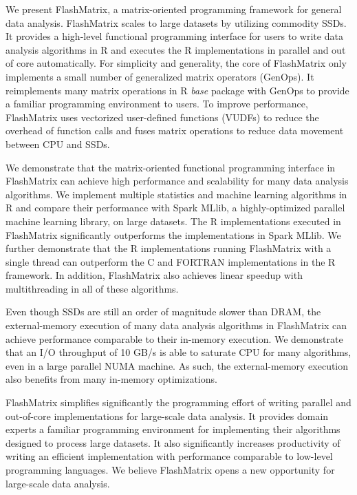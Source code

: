 We present FlashMatrix, a matrix-oriented programming framework for general
data analysis. FlashMatrix scales to large datasets by utilizing commodity SSDs.
It provides a high-level functional programming interface for users to write
data analysis algorithms in R and
executes the R implementations in parallel and out of core automatically.
For simplicity and generality, the core of FlashMatrix only implements
a small number of generalized matrix operators (GenOps). It reimplements
many matrix operations in R \textit{base} package with GenOps to provide
a familiar programming environment to users. To improve performance,
FlashMatrix uses vectorized user-defined functions (VUDFs) to reduce the
overhead of function calls and fuses matrix operations to reduce data movement
between CPU and SSDs.

We demonstrate that the matrix-oriented functional programming interface in
FlashMatrix can achieve high performance and scalability for many data analysis
algorithms. We implement multiple statistics and
machine learning algorithms in R and compare their performance with Spark
MLlib, a highly-optimized parallel machine learning library, on large datasets.
The R implementations executed in FlashMatrix significantly outperforms
the implementations in Spark MLlib. We further demonstrate that
the R implementations running FlashMatrix with a single thread can outperform
the C and FORTRAN implementations in the R framework. In addition, FlashMatrix
also achieves linear speedup with multithreading in all of these algorithms.

Even though SSDs are still an order of magnitude slower than DRAM, the external-memory
execution of many data analysis algorithms in FlashMatrix can achieve performance
comparable to their in-memory execution. We demonstrate that an I/O throughput
of 10 GB/s is able to saturate CPU for many algorithms, even in a large parallel
NUMA machine. As such, the external-memory execution also benefits from many
in-memory optimizations.

FlashMatrix simplifies significantly the programming effort of writing
parallel and out-of-core implementations for large-scale data analysis. It
provides domain experts a familiar programming environment for implementing
their algorithms designed to process large datasets. It also significantly
increases productivity of writing an efficient implementation with performance
comparable to low-level programming languages. We believe FlashMatrix opens
a new opportunity for large-scale data analysis.
